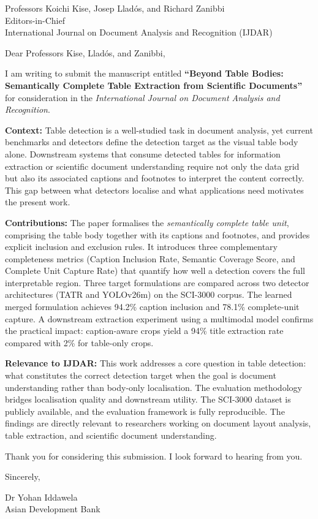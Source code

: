 \documentclass[11pt]{letter}
\begin{document}
\begin{letter}{%
Professors Koichi Kise, Josep Llad\'{o}s, and Richard Zanibbi\\
Editors-in-Chief\\
International Journal on Document Analysis and Recognition (IJDAR)}

\opening{Dear Professors Kise, Llad\'{o}s, and Zanibbi,}

I am writing to submit the manuscript entitled \textbf{``Beyond Table Bodies: Semantically Complete Table Extraction from Scientific Documents''} for consideration in the \textit{International Journal on Document Analysis and Recognition}.

\smallskip
\textbf{Context:}\quad
Table detection is a well-studied task in document analysis, yet current benchmarks and detectors define the detection target as the visual table body alone. Downstream systems that consume detected tables for information extraction or scientific document understanding require not only the data grid but also its associated captions and footnotes to interpret the content correctly. This gap between what detectors localise and what applications need motivates the present work.

\smallskip
\textbf{Contributions:}\quad
The paper formalises the \emph{semantically complete table unit}, comprising the table body together with its captions and footnotes, and provides explicit inclusion and exclusion rules. It introduces three complementary completeness metrics (Caption Inclusion Rate, Semantic Coverage Score, and Complete Unit Capture Rate) that quantify how well a detection covers the full interpretable region. Three target formulations are compared across two detector architectures (TATR and YOLOv26m) on the SCI-3000 corpus. The learned merged formulation achieves 94.2\% caption inclusion and 78.1\% complete-unit capture. A downstream extraction experiment using a multimodal model confirms the practical impact: caption-aware crops yield a 94\% title extraction rate compared with 2\% for table-only crops.

\smallskip
\textbf{Relevance to IJDAR:}\quad
This work addresses a core question in table detection: what constitutes the correct detection target when the goal is document understanding rather than body-only localisation. The evaluation methodology bridges localisation quality and downstream utility. The SCI-3000 dataset is publicly available, and the evaluation framework is fully reproducible. The findings are directly relevant to researchers working on document layout analysis, table extraction, and scientific document understanding.

\smallskip
Thank you for considering this submission. I look forward to hearing from you.

\bigskip
\noindent Sincerely,

\bigskip
\noindent Dr Yohan Iddawela\\
Asian Development Bank

\end{letter}
\end{document}
